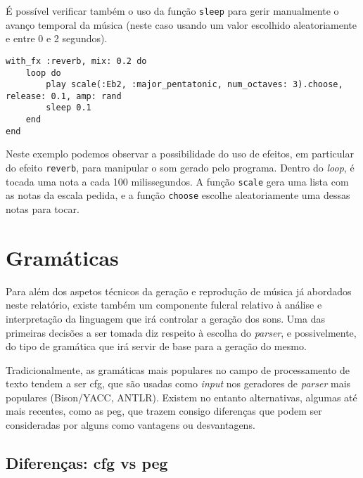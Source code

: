 É possível verificar também o uso da função \texttt{sleep} para gerir manualmente o avanço temporal da música (neste caso usando um valor escolhido aleatoriamente e entre 0 e 2 segundos).


\begin{lstlisting}[caption={Reproduzir um notas de uma escala aleatórias, com efeito \textit{reverb}}] 
with_fx :reverb, mix: 0.2 do
    loop do
        play scale(:Eb2, :major_pentatonic, num_octaves: 3).choose, release: 0.1, amp: rand
        sleep 0.1
    end
end
\end{lstlisting}
Neste exemplo podemos observar a possibilidade do uso de efeitos, em particular do efeito \texttt{reverb}, para manipular o som gerado pelo programa. Dentro do \textit{loop}, é tocada uma nota a cada 100 milissegundos. A função \texttt{scale} gera uma lista com as notas da escala pedida, e a função \texttt{choose} escolhe aleatoriamente uma dessas notas para tocar.
    
\section{Gramáticas}


Para além dos aspetos técnicos da geração e reprodução de música já abordados neste relatório, existe também um componente fulcral relativo à análise e interpretação da linguagem que irá controlar a geração dos sons. Uma das primeiras decisões a ser tomada diz respeito à escolha do \textit{parser}, e possivelmente, do tipo de gramática que irá servir de base para a geração do mesmo.

Tradicionalmente, as gramáticas mais populares no campo de processamento de texto tendem a ser \acrfull{cfg}, que são usadas como \textit{input} nos geradores de \textit{parser} mais populares (Bison/YACC, ANTLR). Existem no entanto alternativas, algumas até mais recentes, como as \acrfull{peg}, que trazem consigo diferenças que podem ser consideradas por alguns como vantagens ou desvantagens.

\subsection{Diferenças: \acrshort{cfg} vs \acrshort{peg}}

